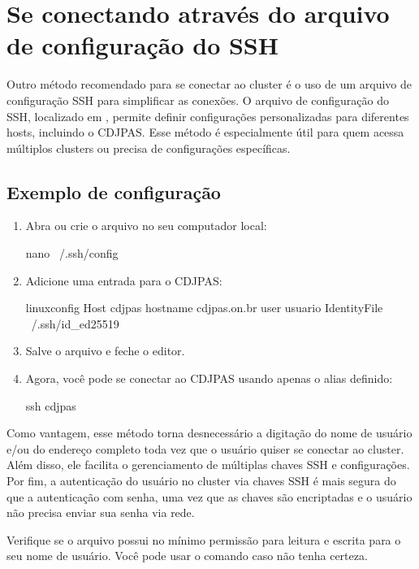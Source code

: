 \section{Se conectando através do arquivo de configuração do SSH}
\label{sec:se-conectando-atraves-do-arquivo-de-configuracao-do-SSH}

Outro método recomendado para se conectar ao cluster é o uso de um arquivo de configuração SSH para simplificar as conexões. O arquivo de configuração do SSH, localizado em , permite definir configurações personalizadas para diferentes hosts, incluindo o CDJPAS. Esse método é especialmente útil para quem acessa múltiplos clusters ou precisa de configurações específicas.


\subsection{Exemplo de configuração}
\label{subsec:exemplo-de-configuracao}

\begin{enumerate}
    \item Abra ou crie o arquivo  no seu computador local:
    \begin{terminal}
        nano ~/.ssh/config
    \end{terminal}

    \item Adicione uma entrada para o CDJPAS:
    \begin{code}{linuxconfig}
        Host cdjpas
            hostname cdjpas.on.br
            user usuario
            IdentityFile ~/.ssh/id_ed25519
    \end{code}

    \item Salve o arquivo e feche o editor.

    \item Agora, você pode se conectar ao CDJPAS usando apenas o alias definido:
    \begin{terminal}
        ssh cdjpas
    \end{terminal}
\end{enumerate}

Como vantagem, esse método torna desnecessário a digitação do nome de usuário e/ou do endereço completo toda vez que o usuário quiser se conectar ao cluster. Além disso, ele facilita o gerenciamento de múltiplas chaves SSH e configurações. Por fim, a autenticação do usuário no cluster via chaves SSH é mais segura do que a autenticação com senha, uma vez que as chaves são encriptadas e o usuário não precisa enviar sua senha via rede.

\begin{warning}
    Verifique se o arquivo  possui no mínimo permissão para leitura e escrita para o seu nome de usuário.
    Você pode usar o comando  caso não tenha certeza.
\end{warning}

